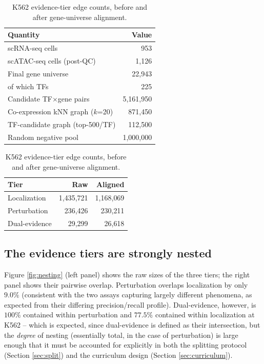 \documentclass{article}
\theoremstyle{plain}
\theoremstyle{definition}
\begin{document}
\begin{table}[t]
\caption{K562 data footprint.}
\label{tab:data}
\vskip 0.1in
\begin{center}
\begin{small}
\begin{tabular}{lr}
\toprule
Quantity & Value \\
\midrule
scRNA-seq cells & 953 \\
scATAC-seq cells (post-QC) & 1{,}126 \\
Final gene universe & 22{,}943 \\
\quad of which TFs & 225 \\
Candidate TF$\times$gene pairs & 5{,}161{,}950 \\
Co-expression kNN graph ($k$=20) & 871{,}450 \\
TF-candidate graph (top-500/TF) & 112{,}500 \\
Random negative pool & 1{,}000{,}000 \\
\bottomrule
\end{tabular}
\end{small}
\end{center}
\vskip 0.1in
\caption{K562 evidence-tier edge counts, before and after gene-universe alignment.}
\label{tab:tiers}
\begin{center}
\begin{small}
\begin{tabular}{lrr}
\toprule
Tier & Raw & Aligned \\
\midrule
Localization & 1{,}435{,}721 & 1{,}168{,}069 \\
Perturbation & 236{,}426 & 230{,}211 \\
Dual-evidence & 29{,}299 & 26{,}618 \\
\bottomrule
\end{tabular}
\end{small}
\end{center}
\end{table}

\subsection{The evidence tiers are strongly nested}
\label{sec:nesting}
Figure \ref{fig:nesting} (left panel) shows the raw sizes of the three tiers; the
right panel shows their pairwise overlap. Perturbation overlaps localization by
only $9.0\%$ (consistent with the two assays capturing largely different
phenomena, as expected from their differing precision/recall profile).
Dual-evidence, however, is $100\%$ contained within perturbation and $77.5\%$
contained within localization at K562 -- which is expected, since
dual-evidence is defined as their intersection, but the \emph{degree} of nesting
(essentially total, in the case of perturbation) is large enough that it must be
accounted for explicitly in both the splitting protocol (Section
\ref{sec:split}) and the curriculum design (Section \ref{sec:curriculum}).
\end{document}
